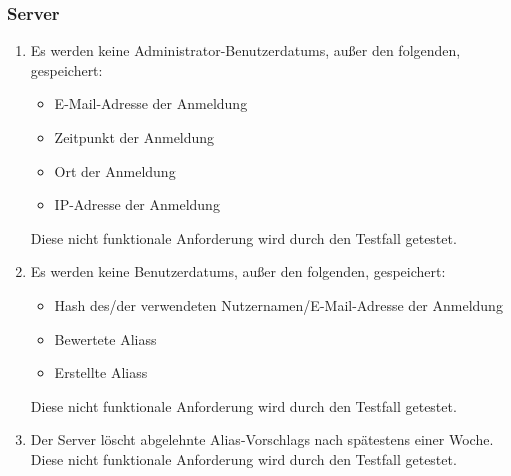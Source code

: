 \subsubsection*{Server}

\begin{samepage}
    \begin{enumerate}[label=\textbf{/NFD\arabic*0/}, align=left, start=5]
        \item \label{/NFD50/} Es werden keine \Gls{Administrator}-\Glspl{Benutzerdatum}, außer den folgenden, gespeichert:
            \begin{itemize}
                \item E-Mail-Adresse der Anmeldung
                \item Zeitpunkt der Anmeldung
                \item Ort der Anmeldung
                \item \Gls{IP-Adresse} der Anmeldung
            \end{itemize}
            Diese nicht funktionale Anforderung wird durch den Testfall  getestet.
        \item \label{/NFD60/} Es werden keine \Glspl{Benutzerdatum}, außer den folgenden, gespeichert:
            \begin{itemize}
                \item \Gls{Hash} des/der verwendeten Nutzernamen/E-Mail-Adresse der Anmeldung
                \item Bewertete \Glspl{Alias} 
                \item Erstellte \Glspl{Alias} 
            \end{itemize}
            Diese nicht funktionale Anforderung wird durch den Testfall  getestet.
        \item \label{/NFD70/} Der \Gls{Server} löscht abgelehnte \Glspl{Alias-Vorschlag} nach spätestens einer Woche. Diese nicht funktionale Anforderung wird durch den Testfall  getestet.
    \end{enumerate}
\end{samepage}
